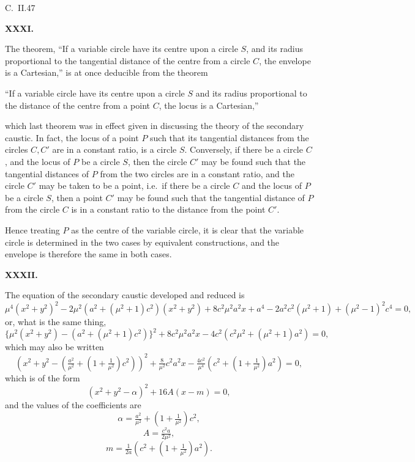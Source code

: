 \documentclass[11pt]{article}
\begin{document}
\hfill C.\ II.\hfill 47

\newpage

\begin{center}\textbf{XXXI.}\end{center}
The theorem, ``If a variable circle have its centre upon a circle $S$, and its radius proportional to the tangential distance of the centre from a circle $C$, the envelope is a Cartesian,'' is at once deducible from the theorem

``If a variable circle have its centre upon a circle $S$ and its radius proportional to the distance of the centre from a point $C$, the locus is a Cartesian,''

\noindent which last theorem was in effect given in discussing the theory of the secondary caustic. In fact, the locus of a point $P$ such that its tangential distances from the circles $C, C'$ are in a constant ratio, is a circle $S$. Conversely, if there be a circle $C$, and the locus of $P$ be a circle $S$, then the circle $C'$ may be found such that the tangential distances of $P$ from the two circles are in a constant ratio, and the circle $C'$ may be taken to be a point, i.e.\ if there be a circle $C$ and the locus of $P$ be a circle $S$, then a point $C'$ may be found such that the tangential distance of $P$ from the circle $C$ is in a constant ratio to the distance from the point $C'$.

Hence treating $P$ as the centre of the variable circle, it is clear that the variable circle is determined in the two cases by equivalent constructions, and the envelope is therefore the same in both cases.

\bigskip
\begin{center}\textbf{XXXII.}\end{center}
The equation of the secondary caustic developed and reduced is
\[
\mu^4(x^2 + y^2)^2 - 2\mu^2(a^2 + (\mu^2 + 1)c^2)(x^2 + y^2) + 8c^2\mu^2 a^2 x + a^4 - 2a^2 c^2(\mu^2 + 1) + (\mu^2 - 1)^2 c^4 = 0,
\]
or, what is the same thing,
\[
\{\mu^2(x^2 + y^2) - (a^2 + (\mu^2 + 1)c^2)\}^2 + 8c^2\mu^2 a^2 x - 4c^2(c^2\mu^2 + (\mu^2 + 1)a^2) = 0,
\]
which may also be written
\[
\left(x^2 + y^2 - \!\left(\tfrac{a^2}{\mu^2} + (1 + \tfrac{1}{\mu^2})c^2\right)\right)^2 + \tfrac{8}{\mu^2}c^2 a^2 x - \tfrac{4c^2}{\mu^4}\!\left(c^2 + (1 + \tfrac{1}{\mu^2})a^2\right) = 0,
\]
which is of the form
\[
(x^2 + y^2 - \alpha)^2 + 16A(x - m) = 0,
\]
and the values of the coefficients are
\[
\alpha = \tfrac{a^2}{\mu^2} + (1 + \tfrac{1}{\mu^2})c^2,
\]
\[
A = \tfrac{c^2 a}{2\mu^2},
\]
\[
m = \tfrac{1}{2a}\!\left(c^2 + (1 + \tfrac{1}{\mu^2})a^2\right).
\]
\end{document}

